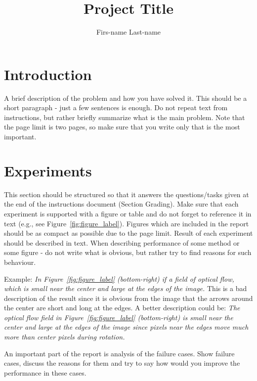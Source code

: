 \documentclass[9pt]{IEEEtran}
\title{\vspace{0ex}
Project Title}
\author{Firs-name Last-name\vspace{-4.0ex}}
\begin{document}
\maketitle

\section{Introduction}

A brief description of the problem and how you have solved it. This should be a short paragraph - just a few sentences is enough.
Do not repeat text from instructions, but rather briefly summarize what is the main problem.
Note that the page limit is two pages, so make sure that you write only that is the most important.

\section{Experiments}

This section should be structured so that it answers the questions/tasks given at the end of the instructions document (Section Grading). 
Make sure that each experiment is supported with a figure or table and do not forget to reference it in text (e.g., see Figure~\ref{fig:figure_label}). 
Figures which are included in the report should be as compact as possible due to the page limit.
Result of each experiment should be described in text. When describing performance of some method or some figure - do not write what is obvious, but rather try to find reasons for such behaviour.

Example: 
{\it In Figure~\ref{fig:figure_label} (bottom-right) if a field of optical flow, which is small near the center and large at the edges of the image.}
This is a bad description of the result since it is obvious from the image that the arrows around the center are short and long at the edges.
A better description could be:
{\it The optical flow field in Figure~\ref{fig:figure_label} (bottom-right) is small near the center and large at the edges of the image since pixels near the edges move much more than center pixels during rotation.}

An important part of the report is analysis of the failure cases. 
Show failure cases, discuss the reasons for them and try to say how would you improve the performance in these cases.
\end{document}
